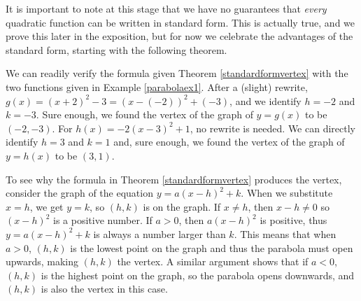\smallskip


\smallskip

It is important to note at this stage that we have no guarantees that \textit{every} quadratic function can be written in standard form.  This is actually true, and we prove this later in the exposition, but for now we celebrate the advantages of the standard form, starting with the following theorem.

\smallskip


\smallskip

We can readily verify the formula given Theorem \ref{standardformvertex} with the two functions given in Example \ref{parabolaex1}.  After a (slight) rewrite, $g(x) = (x+2)^2 - 3 = (x-(-2))^2+(-3)$, and we identify $h=-2$ and $k=-3$.  Sure enough, we found the vertex of the graph of $y=g(x)$ to be $(-2,-3)$. For $h(x) = -2(x-3)^{2}+1$, no rewrite is needed.  We can directly identify $h=3$ and $k=1$ and, sure enough, we found the vertex of the graph of $y=h(x)$ to be  $(3,1)$. 

\smallskip


To see why the formula in Theorem \ref{standardformvertex} produces the vertex, consider the graph of the equation $y = a(x-h)^2 + k$.  When we substitute $x=h$, we get $y=k$, so $(h,k)$ is on the graph.  If $x \neq h$, then $x-h \neq 0$ so $(x-h)^2$ is a positive number.  If $a>0$, then $a(x-h)^2$ is positive, thus $y = a(x-h)^2 + k$ is always a number larger than $k$.  This means that when $a>0$, $(h,k)$ is the lowest point on the graph and thus the parabola must open upwards, making $(h,k)$ the vertex.  A similar argument shows that if $a<0$, $(h,k)$ is the highest point on the graph, so the parabola opens downwards, and $(h,k)$ is also the vertex in this case.

